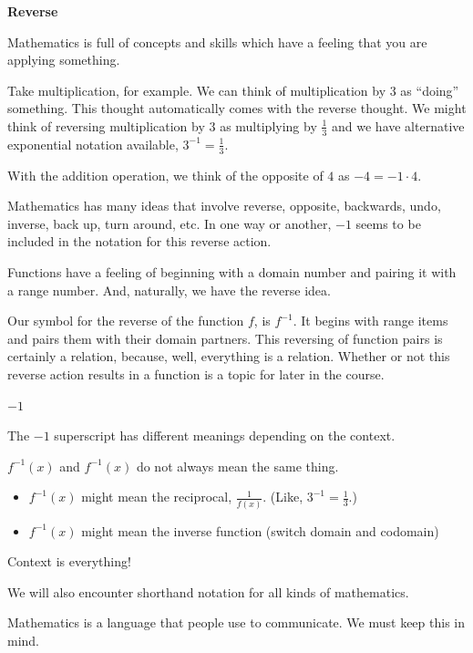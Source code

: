\documentclass{ximera}
\begin{document}
\begin{notation} \textbf{\textcolor{red!50!green}{Reverse}}  

Mathematics is full of concepts and skills which have a feeling that you are applying something.

Take multiplication, for example.  We can think of multiplication by $3$ as ``doing'' something.  This thought automatically comes with the reverse thought.  We might think of reversing multiplication by $3$ as multiplying by $\frac{1}{3}$ and we have alternative exponential notation available, $3^{-1} = \frac{1}{3}$. 


With the addition operation, we think of the opposite of $4$ as $-4 = -1 \cdot 4$. 


Mathematics has many ideas that involve reverse, opposite, backwards, undo, inverse, back up, turn around, etc. In one way or another, $-1$ seems to be included in the notation for this reverse action.  


Functions have a feeling of beginning with a domain number and pairing it with a range number.  And, naturally, we have the reverse idea. 

Our symbol for the reverse of the function $f$, is $f^{-1}$.  It begins with range items and pairs them with their domain partners.  This reversing of function pairs is certainly a relation, because, well, everything is a relation.  Whether or not this reverse action results in a function is a topic for later in the course.



\end{notation}



\begin{warning} \textbf{\textcolor{red!70!black}{$-1$}}


The $-1$ superscript has different meanings depending on the context. 


$f^{-1}(x)$ and $f^{-1}(x)$ do not always mean the same thing.


\begin{itemize}
\item $f^{-1}(x)$ might mean the reciprocal, $\frac{1}{f(x)}$.  (Like, $3^{-1} = \frac{1}{3}$.)
\item $f^{-1}(x)$ might mean the inverse function (switch domain and codomain)
\end{itemize}


Context is everything! 

We will also encounter shorthand notation for all kinds of mathematics. 

Mathematics is a language that people use to communicate.  We must keep this in mind.

\end{warning}
\end{document}
